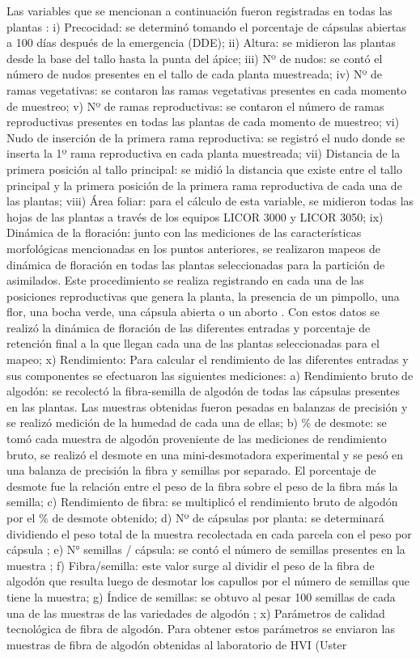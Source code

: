 \documentclass[12pt,oneside]{reedthesis}
\begin{document}
Las variables que se mencionan a continuación fueron registradas en todas las plantas \autocite{kerby2010}: i) Precocidad: se determinó tomando el porcentaje de cápsulas abiertas a 100 días después de la emergencia (DDE); ii) Altura: se midieron las plantas desde la base del tallo hasta la punta del ápice; iii) Nº de nudos: se contó el número de nudos presentes en el tallo de cada planta muestreada; iv) Nº de ramas vegetativas: se contaron las ramas vegetativas presentes en cada momento de muestreo; v) Nº de ramas reproductivas: se contaron el número de ramas reproductivas presentes en todas las plantas de cada momento de muestreo; vi) Nudo de inserción de la primera rama reproductiva: se registró el nudo donde se inserta la 1º rama reproductiva en cada planta muestreada; vii) Distancia de la primera posición al tallo principal: se midió la distancia que existe entre el tallo principal y la primera posición de la primera rama reproductiva de cada una de las plantas; viii) Área foliar: para el cálculo de esta variable, se midieron todas las hojas de las plantas a través de los equipos LICOR 3000 y LICOR 3050; ix) Dinámica de la floración: junto con las mediciones de las características morfológicas mencionadas en los puntos anteriores, se realizaron mapeos de dinámica de floración en todas las plantas seleccionadas para la partición de asimilados. Este procedimiento se realiza registrando en cada una de las posiciones reproductivas que genera la planta, la presencia de un pimpollo, una flor, una bocha verde, una cápsula abierta o un aborto \autocite{kerby1996monitoring}. Con estos datos se realizó la dinámica de floración de las diferentes entradas y porcentaje de retención final a la que llegan cada una de las plantas seleccionadas para el mapeo; x) Rendimiento: Para calcular el rendimiento de las diferentes entradas y sus componentes se efectuaron las siguientes mediciones: a) Rendimiento bruto de algodón: se recolectó la fibra-semilla de algodón de todas las cápsulas presentes en las plantas. Las muestras obtenidas fueron pesadas en balanzas de precisión y se realizó medición de la humedad de cada una de ellas; b) \% de desmote: se tomó cada muestra de algodón proveniente de las mediciones de rendimiento bruto, se realizó el desmote en una mini-desmotadora experimental y se pesó en una balanza de precisión la fibra y semillas por separado. El porcentaje de desmote fue la relación entre el peso de la fibra sobre el peso de la fibra más la semilla; c) Rendimiento de fibra: se multiplicó el rendimiento bruto de algodón por el \% de desmote obtenido; d) Nº de cápsulas por planta: se determinará dividiendo el peso total de la muestra recolectada en cada parcela con el peso por cápsula \autocite{wells1984}; e) N° semillas / cápsula: se contó el número de semillas presentes en la muestra \autocite{worley1974}; f) Fibra/semilla: este valor surge al dividir el peso de la fibra de algodón que resulta luego de desmotar los capullos por el número de semillas que tiene la muestra; g) Índice de semillas: se obtuvo al pesar 100 semillas de cada una de las muestras de las variedades de algodón \autocite{pettigrew2013}; x) Parámetros de calidad tecnológica de fibra de algodón. Para obtener estos parámetros se enviaron las muestras de fibra de algodón obtenidas al laboratorio de HVI (Uster 
\end{document}
